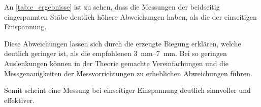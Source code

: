 \begin{table}
  \centering
  \caption{Ergebnisse für $E$ mit entsprechenden Referenzwerten\cite{youngs_modulus}}
  \label{tab:e_ergebnisse}
\end{table}

An \autoref{tab:e_ergebnisse} ist zu sehen, dass die Messungen der beidseitig eingespannten Stäbe deutlich höhere Abweichungen haben, als die der einseitigen Einspannung.

Diese Abweichungen lassen sich durch die erzeugte Biegung erklären, welche deutlich geringer ist, als die empfohlenen \SIrange{3}{7}{\milli\meter}.
Bei so geringen Auslenkungen können in der Theorie gemachte Vereinfachungen und die Messgenauigkeiten der Messvorrichtungen zu erheblichen Abweichungen führen.

Somit scheint eine Messung bei einseitiger Einspannung deutlich sinnvoller und effektiver.